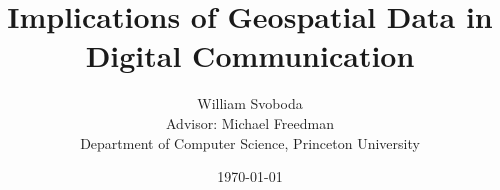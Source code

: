 \documentclass[12pt,twocolumn,twoside,abstract=true]{scrartcl}
\begin{document}
\title{Implications of Geospatial Data in Digital Communication}
\author{William Svoboda\\Advisor: Michael Freedman\\Department of Computer Science, Princeton University}
\date{\monthyeardate\today}

\maketitle










\printbibliography
\end{document}
